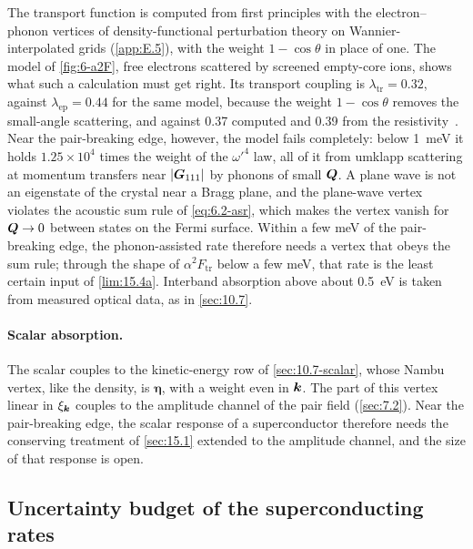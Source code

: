 The transport function is computed from first principles with the electron--phonon vertices of density-functional perturbation theory on Wannier-interpolated grids (\cref{app:E.5}), with the weight $1 - \cos\theta$ in place of one. The model of \cref{fig:6-a2F}, free electrons scattered by screened empty-core ions, shows what such a calculation must get right. Its transport coupling is $\lambda_{\mathrm{tr}} = 0.32$, against $\lambda_{\mathrm{ep}} = 0.44$ for the same model, because the weight $1 - \cos\theta$ removes the small-angle scattering, and against 0.37 computed and 0.39 from the resistivity~\cite[Table~IV]{savrasov1996electron}. Near the pair-breaking edge, however, the model fails completely: below \SI{1}{meV} it holds $1.25\times10^4$ times the weight of the $\omega'^4$ law, all of it from umklapp scattering at momentum transfers near $|\bm{G}_{111}|$ by phonons of small $\bm{Q}$. A plane wave is not an eigenstate of the crystal near a Bragg plane, and the plane-wave vertex violates the acoustic sum rule of \cref{eq:6.2-asr}, which makes the vertex vanish for $\bm{Q} \to 0$ between states on the Fermi surface. Within a few meV of the pair-breaking edge, the phonon-assisted rate therefore needs a vertex that obeys the sum rule; through the shape of $\alpha^2F_{\mathrm{tr}}$ below a few meV, that rate is the least certain input of \cref{lim:15.4a}. Interband absorption above about \SI{0.5}{eV} is taken from measured optical data, as in \cref{sec:10.7}.

\paragraph{Scalar absorption.} The scalar couples to the kinetic-energy row of \cref{sec:10.7-scalar}, whose Nambu vertex, like the density, is $\boldsymbol{\eta}$, with a weight even in $\bm{k}$. The part of this vertex linear in $\xi_{\bm{k}}$ couples to the amplitude channel of the pair field (\cref{sec:7.2}). Near the pair-breaking edge, the scalar response of a superconductor therefore needs the conserving treatment of \cref{sec:15.1} extended to the amplitude channel, and the size of that response is open.

\subsection{Uncertainty budget of the superconducting rates}\label{sec:15.4-budget}

